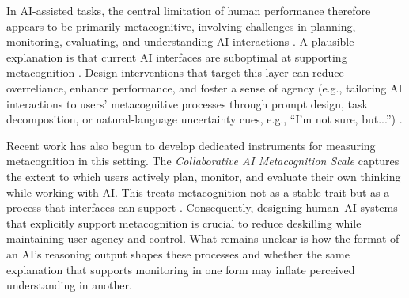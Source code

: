 \documentclass[manuscript,review,anonymous]{acmart}
\begin{document}



In AI-assisted tasks, the central limitation of human performance therefore appears to be primarily metacognitive, involving challenges in planning, monitoring, evaluating, and understanding AI interactions \cite{tankelevitch2023metacognitive}. A plausible explanation is that current AI interfaces are suboptimal at supporting metacognition \cite{ramesh2026metacognitive}. Design interventions that target this layer can reduce overreliance, enhance performance, and foster a sense of agency (e.g., tailoring AI interactions to users' metacognitive processes through prompt design, task decomposition, or natural-language uncertainty cues, e.g., ``I'm not sure, but...'') \cite{tankelevitch2023metacognitive, draxlerghost24, kim2024m}. 

Recent work has also begun to develop dedicated instruments for measuring metacognition in this setting. The \textit{Collaborative AI Metacognition Scale} captures the extent to which users actively plan, monitor, and evaluate their own thinking while working with AI. This treats metacognition not as a stable trait but as a process that interfaces can support \cite{Sidra03042026}. Consequently, designing human–AI systems that explicitly support metacognition is crucial to reduce deskilling while maintaining user agency and control. What remains unclear is how the format of an AI's reasoning output shapes these processes and whether the same explanation that supports monitoring in one form may inflate perceived understanding in another.
\end{document}
